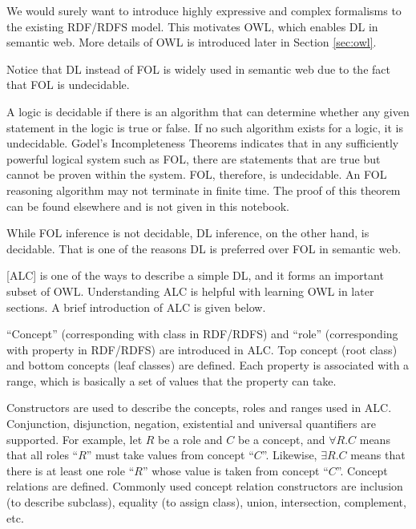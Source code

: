 \begin{shortbox}
	

We would surely want to introduce highly expressive and complex formalisms to the existing RDF/RDFS model. This motivates OWL, which enables DL in semantic web. More details of OWL is introduced later in Section \ref{sec:owl}. 

Notice that DL instead of FOL is widely used in semantic web due to the fact that FOL is undecidable.

A logic is decidable if there is an algorithm that can determine whether any given statement in the logic is true or false. If no such algorithm exists for a logic, it is undecidable. G$\ddot{o}$del's Incompleteness Theorems indicates that in any sufficiently powerful logical system such as FOL, there are statements that are true but cannot be proven within the system. FOL, therefore, is undecidable. An FOL reasoning algorithm may not terminate in finite time. The proof of this theorem can be found elsewhere and is not given in this notebook.

While FOL inference is not decidable, DL inference, on the other hand, is decidable. That is one of the reasons DL is preferred over FOL in semantic web.
	
\end{shortbox}

[ALC] is one of the ways to describe a simple DL, and it forms an important subset of OWL. Understanding ALC is helpful with learning OWL in later sections. A brief introduction of ALC is given below.

``Concept'' (corresponding with class in RDF/RDFS) and ``role'' (corresponding with property in RDF/RDFS) are introduced in ALC. Top concept (root class) and bottom concepts (leaf classes) are defined. Each property is associated with a range, which is basically a set of values that the property can take.

Constructors are used to describe the concepts, roles and ranges used in ALC. Conjunction, disjunction, negation, existential and universal quantifiers are supported. For example, let $R$ be a role and $C$ be a concept, and $\forall R.C$ means that all roles ``$R$'' must take values from concept ``$C$''. Likewise, $\exists R.C$ means that there is at least one role ``$R$'' whose value is taken from concept ``$C$''. Concept relations are defined. Commonly used concept relation constructors are inclusion (to describe subclass), equality (to assign class), union, intersection, complement, etc.

